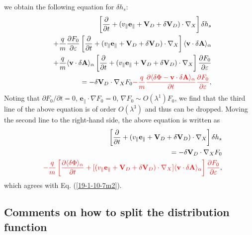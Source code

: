 \documentclass{article}
\newcommand{\tmcolor}[2]{{\color{#1}{#2}}}
\begin{document}
we obtain the following equation for $\delta h_s$:
\begin{eqnarray}
  &  & \left[ \frac{\partial}{\partial t} + (v_{\parallel}
  \mathbf{e}_{\parallel} +\mathbf{V}_D + \delta \mathbf{V}_D) \cdot \nabla_X
  \right] \delta h_s \nonumber\\
  &  & + \frac{q}{m} \frac{\partial F_0}{\partial \varepsilon} \left[
  \frac{\partial}{\partial t} + (v_{\parallel} \mathbf{e}_{\parallel}
  +\mathbf{V}_D + \delta \mathbf{V}_D) \cdot \nabla_X \right] \langle
  \mathbf{v} \cdot \delta \mathbf{A} \rangle_{\alpha} \nonumber\\
  &  & + \frac{q}{m} \langle \mathbf{v} \cdot \delta \mathbf{A}
  \rangle_{\alpha} \left[ \frac{\partial}{\partial t} + (v_{\parallel}
  \mathbf{e}_{\parallel} +\mathbf{V}_D + \delta \mathbf{V}_D) \cdot \nabla_X
  \right] \frac{\partial F_0}{\partial \varepsilon} \nonumber\\
  &  & = - \delta \mathbf{V}_D \cdot \nabla_X F_0 \tmcolor{red}{- \frac{q}{m}
  \frac{\partial \langle \delta \Phi -\mathbf{v} \cdot \delta \mathbf{A}
  \rangle_{\alpha}}{\partial t} \frac{\partial F_0}{\partial \varepsilon}}, 
  \label{19-1-10-e1}
\end{eqnarray}
Noting that $\partial F_0 / \partial t = 0$, $\mathbf{e}_{\parallel} \cdot
\nabla F_0 = 0$, $\nabla F_0 \sim O (\lambda^1) F_0$, we find that the third
line of the above equation is of order $O (\lambda^3)$ and thus can be
dropped. Moving the second line to the right-hand side, the above equation is
written as
\begin{eqnarray}
  &  & \left[ \frac{\partial}{\partial t} + (v_{\parallel}
  \mathbf{e}_{\parallel} +\mathbf{V}_D + \delta \mathbf{V}_D) \cdot \nabla_X
  \right] \delta h_s \nonumber\\
  &  & = - \delta \mathbf{V}_D \cdot \nabla_X F_0 \nonumber\\
  &  & \tmcolor{red}{- \frac{q}{m}  \left[ \frac{\partial \langle \delta \Phi
  \rangle_{\alpha}}{\partial t} + [(v_{\parallel} \mathbf{e}_{\parallel}
  +\mathbf{V}_D + \delta \mathbf{V}_D) \cdot \nabla_X] \langle \mathbf{v}
  \cdot \delta \mathbf{A} \rangle_{\alpha} \right] \frac{\partial
  F_0}{\partial \varepsilon}},  \label{19-1-10-e2}
\end{eqnarray}
which agrees with Eq. (\ref{19-1-10-7m2}).

\subsection{Comments on how to split the distribution function}
\end{document}
